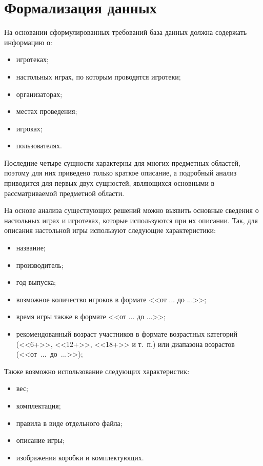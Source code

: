 \section{\label{head:01}Формализация данных}

На основании сформулированных требований база данных должна содержать информацию
о:

\begin{itemize}
    \item игротеках;
    \item настольных играх, по которым проводятся игротеки;
    \item организаторах;
    \item местах проведения;
    \item игроках;
    \item пользователях.
\end{itemize}

Последние четыре сущности характерны для многих предметных областей, поэтому для
них приведено только краткое описание, а подробный анализ приводится для первых
двух сущностей, являющихся основными в рассматриваемой предметной области.

На основе анализа существующих решений можно выявить основные сведения о
настольных играх и игротеках, которые используются при их описании. Так, для
описания настольной игры используют следующие характеристики:

\begin{itemize}
    \item название;
    \item производитель;
    \item год выпуска;
    \item возможное количество игроков в формате <<от ... до ...>>;
    \item время игры также в формате <<от ... до ...>>;
    \item рекомендованный возраст участников в формате возрастных категорий
        (<<6+>>, <<12+>>, <<18+>> и т.~п.) или диапазона возрастов
        (<<от~...~до~...>>);
\end{itemize}

Также возможно использование следующих характеристик:
\begin{itemize}
    \item вес;
    \item комплектация;
    \item правила в виде отдельного файла;
    \item описание игры;
    \item изображения коробки и комплектующих.
\end{itemize}


